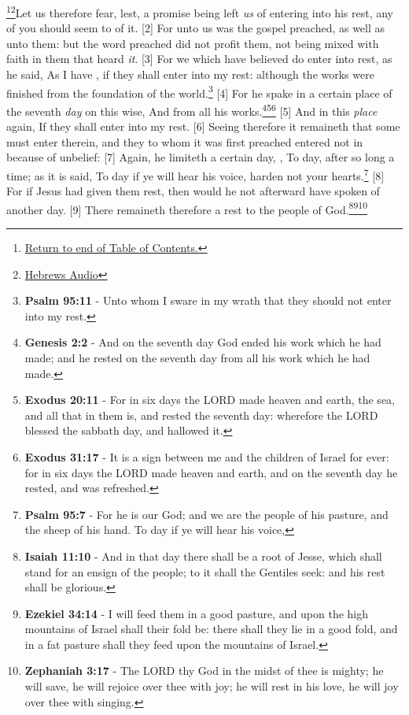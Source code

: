 \footnote{\textcolor[cmyk]{0.99998,1,0,0}{\hyperlink{TOC}{Return to end of Table of Contents.}}}\footnote{\href{https://www.audioverse.org/english/audiobibles/books/ENGKJV/N/Heb/1}{\textcolor[cmyk]{0.99998,1,0,0}{Hebrews Audio}}}\textcolor[cmyk]{0.99998,1,0,0}{Let us therefore fear, lest, a promise being left \emph{us} of entering into his rest, any of you should seem to  of it.}
[2] \textcolor[cmyk]{0.99998,1,0,0}{For unto us was the gospel preached, as well as unto them: but the word preached did not profit them, not being mixed with faith in them that heard \emph{it}.}
[3] \textcolor[cmyk]{0.99998,1,0,0}{For we which have believed do enter into rest, as he said, As I have , if they shall enter into my rest: although the works were finished from the foundation of the world.}\footnote{\textbf{Psalm 95:11} - Unto whom I sware in my wrath that they should not enter into my rest.} 
[4] \textcolor[cmyk]{0.99998,1,0,0}{For he spake in a certain place of the seventh \emph{day} on this wise, And   from all his works.}\footnote{\textbf{Genesis 2:2} - And on the seventh day God ended his work which he had made; and he rested on the seventh day from all his work which he had made.}\footnote{\textbf{Exodus 20:11} - For in six days the LORD made heaven and earth, the sea, and all that in them is, and rested the seventh day: wherefore the LORD blessed the sabbath day, and hallowed it.}\footnote{\textbf{Exodus 31:17} - It is a sign between me and the children of Israel for ever: for in six days the LORD made heaven and earth, and on the seventh day he rested, and was refreshed.} 
[5] \textcolor[cmyk]{0.99998,1,0,0}{And in this \emph{place} again, If they shall enter into my rest.}
[6] \textcolor[cmyk]{0.99998,1,0,0}{Seeing therefore it remaineth that some must enter therein, and they to whom it was first preached entered not in because of unbelief:}
[7] \textcolor[cmyk]{0.99998,1,0,0}{Again, he limiteth a certain day, , To day, after so long a time; as it is said, To day if ye will hear his voice, harden not your hearts.}\footnote{\textbf{Psalm 95:7} - For he is our God; and we are the people of his pasture, and the sheep of his hand. To day if ye will hear his voice,}
[8] \textcolor[cmyk]{0.99998,1,0,0}{For if Jesus had given them rest, then would he not afterward have spoken of another day.}
[9] \textcolor[cmyk]{0.99998,1,0,0}{There remaineth therefore a rest to the people of God.}\footnote{\textbf{Isaiah 11:10} - And in that day there shall be a root of Jesse, which shall stand for an ensign of the people; to it shall the Gentiles seek: and his rest shall be glorious.}\footnote{\textbf{Ezekiel 34:14} - I will feed them in a good pasture, and upon the high mountains of Israel shall their fold be: there shall they lie in a good fold, and in a fat pasture shall they feed upon the mountains of Israel.}\footnote{\textbf{Zephaniah 3:17} - The LORD thy God in the midst of thee is mighty; he will save, he will rejoice over thee with joy; he will rest in his love, he will joy over thee with singing.} 

